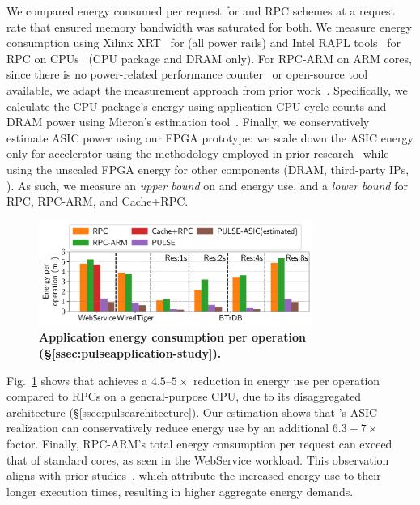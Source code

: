  We compared energy consumed per request for \pulse and RPC schemes at a request rate that ensured memory bandwidth was saturated for both. We measure energy consumption using Xilinx XRT~\cite{xilinx_xrt} for \pulse (all power rails) and Intel RAPL tools~\cite{intel_rapl} for RPC on CPUs~\cite{intelprocessor} (CPU package and DRAM only). For RPC-ARM on ARM cores, since there is no power-related performance counter~\cite{armv8registers} or open-source tool available, we adapt the measurement approach from prior work~\cite{clio}. Specifically, we calculate the CPU package's energy using application CPU cycle counts and DRAM power using Micron's estimation tool~\cite{micron}. Finally, we conservatively estimate ASIC power using our FPGA prototype: we scale down the ASIC energy only for \pulse accelerator using the methodology employed in prior research~\cite{asicpower} while using the unscaled FPGA energy for other components (DRAM, third-party IPs, \etc). As such, we measure an \emph{upper bound} on \pulse and \pulseasic energy use, and a \emph{lower bound} for RPC, RPC-ARM, and Cache+RPC.

\begin{figure}[t]
\centering
\includegraphics[width=0.8\textwidth]{fig/pulse/power.pdf}
\caption[Application energy consumption per operation]{\textbf{Application energy consumption per operation (\S\ref{ssec:pulseapplication-study}).}}
\label{fig:eval_energy}
\end{figure}

Fig.~\ref{fig:eval_energy} shows that \pulse achieves a $4.5$--$5\times$ reduction in energy use per operation compared to RPCs on a general-purpose CPU, due to its disaggregated architecture (\S\ref{ssec:pulsearchitecture}). Our estimation shows that \pulse's ASIC realization can conservatively reduce energy use by an additional $6.3-7\times$ factor. 
Finally, RPC-ARM's total energy consumption per request can exceed that of standard cores, as seen in the WebService workload. This observation aligns with prior studies~\cite{clio}, which attribute the increased energy use to their longer execution times, resulting in higher aggregate energy demands.

